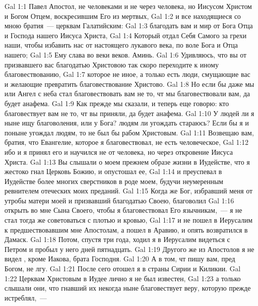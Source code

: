 \vs Gal 1:1 Павел Апостол,  не человеками и не через человека, но Иисусом Христом и Богом Отцем, воскресившим Его из мертвых,
\vs Gal 1:2 и все находящиеся со мною братия~--- церквам Галатийским:
\vs Gal 1:3 благодать вам и мир от Бога Отца и Господа нашего Иисуса Христа,
\vs Gal 1:4 Который отдал Себя Самого за грехи наши, чтобы избавить нас от настоящего лукавого века, по воле Бога и Отца нашего;
\vs Gal 1:5 Ему слава во веки веков. Аминь.
\rsbpar\vs Gal 1:6 Удивляюсь, что вы от призвавшего вас благодатью Христовою так скоро переходите к иному благовествованию,
\vs Gal 1:7 которое  не иное, а только есть люди, смущающие вас и желающие превратить благовествование Христово.
\vs Gal 1:8 Но если бы даже мы или Ангел с неба стал благовествовать вам не то, чт мы благовествовали вам, да будет анафема.
\vs Gal 1:9 Как прежде мы сказали,  и теперь еще говорю: кто благовествует вам не то, чт вы приняли, да будет анафема.
\vs Gal 1:10 У людей ли я ныне ищу благоволения, или у Бога? людям ли угождать стараюсь? Если бы я и поныне угождал людям, то не был бы рабом Христовым.
\rsbpar\vs Gal 1:11 Возвещаю вам, братия, что Евангелие, которое я благовествовал, не есть человеческое,
\vs Gal 1:12 ибо и я принял его и научился не от человека, но через откровение Иисуса Христа.
\vs Gal 1:13 Вы слышали о моем прежнем образе жизни в Иудействе, что я жестоко гнал Церковь Божию, и опустошал ее,
\vs Gal 1:14 и преуспевал в Иудействе более многих сверстников в роде моем, будучи неумеренным ревнителем отеческих моих преданий.
\vs Gal 1:15 Когда же Бог, избравший меня от утробы матери моей и призвавший благодатью Своею, благоволил
\vs Gal 1:16 открыть во мне Сына Своего, чтобы я благовествовал Его язычникам,~--- я не стал тогда же советоваться с плотью и кровью,
\vs Gal 1:17 и не пошел в Иерусалим к предшествовавшим мне Апостолам, а пошел в Аравию, и опять возвратился в Дамаск.
\vs Gal 1:18 Потом, спустя три года, ходил я в Иерусалим видеться с Петром и пробыл у него дней пятнадцать.
\vs Gal 1:19 Другого же из Апостолов я не видел , кроме Иакова, брата Господня.
\vs Gal 1:20 А в том, чт пишу вам, пред Богом, не лгу.
\vs Gal 1:21 После сего отошел я в страны Сирии и Киликии.
\vs Gal 1:22 Церквам Христовым в Иудее лично я не был известен,
\vs Gal 1:23 а только слышали они, что гнавший их некогда ныне благовествует веру, которую прежде истреблял,~---
